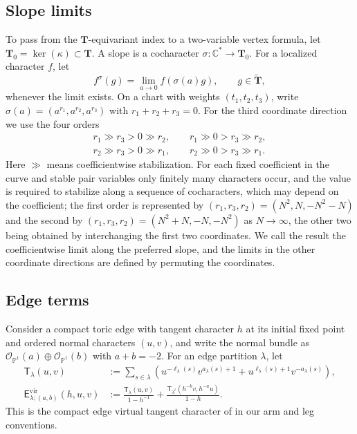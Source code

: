 \documentclass{amsart}
\theoremstyle{definition}
\numberwithin{equation}{section}
\newcommand{\C}{\mathbb C}
\newcommand{\cO}{\mathcal O}
\begin{document}
\subsection{Slope limits}
To pass from the \(\mathbf T\)-equivariant index to a two-variable vertex formula, let \(\mathbf T_0=\ker(\kappa)\subset\mathbf T\).  A slope is a cocharacter \(\sigma:\C^*\to\mathbf T_0\).  For a localized character \(f\), let
\begin{equation}
 f^\sigma(g)=\lim_{a\to0}f(\sigma(a)g),
 \qquad g\in\widetilde{\mathbf T},
\label{eq:slope-limit}
\end{equation}
whenever the limit exists.  On a chart with weights \((t_1,t_2,t_3)\), write \(\sigma(a)=(a^{r_1},a^{r_2},a^{r_3})\) with \(r_1+r_2+r_3=0\).  For the third coordinate direction we use the four orders
\begin{equation*}
\begin{gathered}
 r_1\gg r_3>0\gg r_2,\qquad
 r_1\gg0>r_3\gg r_2,\\
 r_2\gg r_3>0\gg r_1,\qquad
 r_2\gg0>r_3\gg r_1.
\end{gathered}
\end{equation*}
Here \(\gg\) means coefficientwise stabilization.  For each fixed coefficient in the curve and stable pair variables only finitely many characters occur, and the value is required to stabilize along a sequence of cocharacters, which may depend on the coefficient; the first order is represented by \((r_1,r_3,r_2)=(N^2,N,-N^2-N)\) and the second by \((r_1,r_3,r_2)=(N^2+N,-N,-N^2)\) as \(N\to\infty\), the other two being obtained by interchanging the first two coordinates.  We call the result the coefficientwise limit along the preferred slope, and the limits in the other coordinate directions are defined by permuting the coordinates.

\subsection{Edge terms}
Consider a compact toric edge with tangent character \(h\) at its initial fixed point and ordered normal characters \((u,v)\), and write the normal bundle as \(\cO_{\mathbb P^1}(a)\oplus\cO_{\mathbb P^1}(b)\) with \(a+b=-2\).  For an edge partition \(\lambda\), let
\begin{equation}
\begin{aligned}
 \mathsf T_\lambda(u,v)
 &:=\sum_{s\in\lambda}
 \left(u^{-\ell_\lambda(s)}v^{a_\lambda(s)+1}
       +u^{\ell_\lambda(s)+1}v^{-a_\lambda(s)}\right),\\
 \mathsf E^{\mathrm{vir}}_{\lambda;(a,b)}(h,u,v)
 &:=\frac{\mathsf T_\lambda(u,v)}{1-h^{-1}}
  +\frac{\mathsf T_{\lambda^t}(h^{-b}v,h^{-a}u)}{1-h}.
\end{aligned}
\label{eq:general-edge-character}
\end{equation}
This is the compact edge virtual tangent character of \cite[equation~(4.8)]{Arbesfeld} in our arm and leg conventions.
\end{document}
